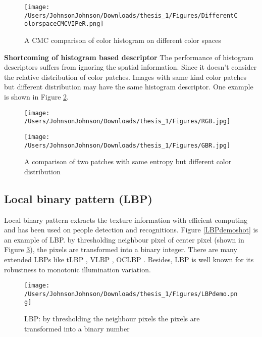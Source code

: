 \begin{figure}
\centering
\texttt{[image: /Users/JohnsonJohnson/Downloads/thesis\_1/Figures/DifferentColorspaceCMCVIPeR.png]}
\caption{A CMC comparison of color histogram on different color spaces }
\label{CMCcolorspaces}
\vspace{0em}
\end{figure} 


\textbf{Shortcoming of histogram based descriptor} The performance of histogram descriptors suffers from ignoring the spatial information. Since it doesn't consider the relative distribution of color patches. Images with same kind color patches but different distribution may have the same histogram descriptor. One example is shown in Figure \ref{RGBbgr}.

\begin{figure}[H]
\begin{minipage}[t]{0.5\linewidth}
\centering
\texttt{[image: /Users/JohnsonJohnson/Downloads/thesis\_1/Figures/RGB.jpg]}
\end{minipage}%
\begin{minipage}[t]{0.5\linewidth}
\centering
\texttt{[image: /Users/JohnsonJohnson/Downloads/thesis\_1/Figures/GBR.jpg]}
\end{minipage}
\caption{A comparison of two patches with same entropy but different color distribution}
\label{RGBbgr}
\end{figure}


\subsection{Local binary pattern (LBP)}
Local binary pattern \cite{LBP1, LBP2} extracts the texture information with efficient computing and has been used on people detection and recognitions. Figure \ref{LBPdemoshot} is an example of LBP. by thresholding neighbour pixel of center pixel (shown in Figure \ref{LBPtheory}), the pixels are transformed into a binary integer. There are many extended LBPs like tLBP \cite{tLBP}, VLBP \cite{VLBP}, OCLBP \cite{OCLBP}. Besides, LBP is well known for its robustness to monotonic illumination variation.
\begin{figure}[H]
\centering
\texttt{[image: /Users/JohnsonJohnson/Downloads/thesis\_1/Figures/LBPdemo.png]}
\caption{LBP: by thresholding the neighbour pixels the pixels are transformed into a binary number }
\label{LBPtheory}
\vspace{0em}
\end{figure}


